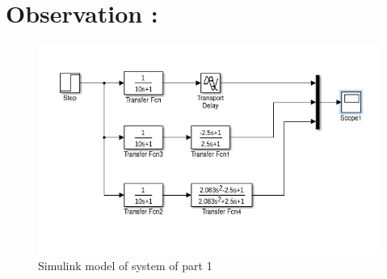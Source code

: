 \message{ !name(lab1.tex)}\documentclass[a4paper,12pt,openany]{book}
\begin{document}
\section{Observation :}
\begin{figure}[H]
  \centering
  \includegraphics[width = 165mm, scale = 0.85]{lab03part1.png}
  \caption{Simulink model of system of part 1}
\end{figure}
\pagebreak
\end{document}
